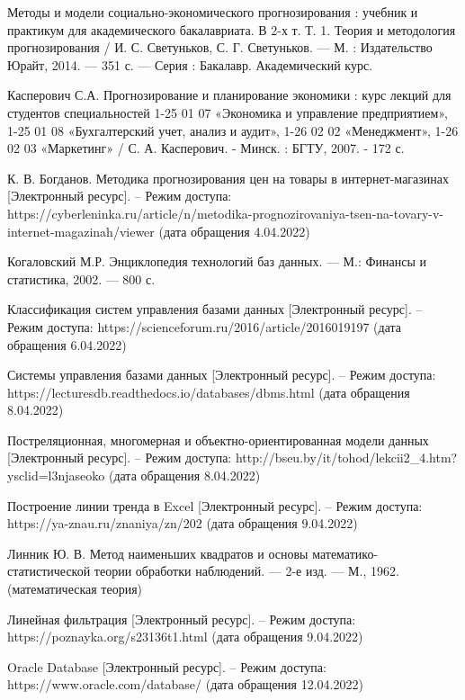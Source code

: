\documentclass[a4paper,14pt]{extreport}
\begin{document}
\begin{thebibliography}{3}
	 Методы и модели социально-экономического прогнозирования : учебник и практикум для академического бакалавриата. В 2-х т. Т. 1. Теория и методология прогнозирования / И. С. Светуньков, С. Г. Светуньков. — М. : Издательство Юрайт, 2014. — 351 с. — Серия : Бакалавр. Академический курс.
	
	 Касперович С.А. Прогнозирование и планирование экономики : курс лекций для студентов специальностей 1-25 01 07 «Экономика и управление предприятием», 1-25 01 08 «Бухгалтерский учет, анализ и аудит», 1-26 02 02 «Менеджмент», 1-26 02 03 «Маркетинг» / С. А. Касперович. - Минск. : БГТУ, 2007. - 172 с. 
	
	 К. В. Богданов. Методика прогнозирования цен на товары в интернет-магазинах [Электронный ресурс]. -- Режим доступа: https://cyberleninka.ru/article/n/metodika-prognozirovaniya-tsen-na-tovary-v-internet-magazinah/viewer (дата обращения 4.04.2022)
	
	 Когаловский М.Р. Энциклопедия технологий баз данных. — М.: Финансы и статистика, 2002. — 800 с.
	
	 Классификация систем управления базами данных [Электронный ресурс]. -- Режим доступа: https://scienceforum.ru/2016/article/2016019197 (дата обращения 6.04.2022)
	
	 Системы управления базами данных [Электронный ресурс]. -- Режим доступа: https://lecturesdb.readthedocs.io/databases/dbms.html (дата обращения 8.04.2022)
	
	 Постреляционная, многомерная и объектно-ориентированная модели данных [Электронный ресурс]. -- Режим доступа:  http://bseu.by/it/tohod/lekcii2\_4.htm?ysclid=l3njaseoko (дата обращения 8.04.2022)
	
	 Построение линии тренда в Excel [Электронный ресурс]. -- Режим доступа: https://ya-znau.ru/znaniya/zn/202 (дата обращения 9.04.2022)
	
	 Линник Ю. В. Метод наименьших квадратов и основы математико-статистической теории обработки наблюдений. — 2-е изд. — М., 1962. (математическая теория)
	
	 Линейная фильтрация [Электронный ресурс]. -- Режим доступа: https://poznayka.org/s23136t1.html (дата обращения 9.04.2022)
	
	 Oracle Database [Электронный ресурс]. -- Режим доступа: https://www.oracle.com/database/ (дата обращения 12.04.2022)
	

\end{thebibliography}
\end{document}
